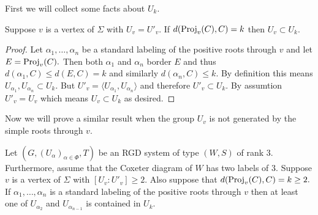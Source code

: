 \documentclass[class=book, crop=false]{standalone}
\begin{document}
First we will collect some facts about $U_k.$
\begin{lemma}
	\label{lem:deg3fg}
	Suppose $v$ is a vertex of $\Sigma$ with $U_v=U'_v.$ If $d(\mathrm{Proj}_v(C),C)=k$ then $U_v\subset U_k.$
\end{lemma}
\begin{proof}
	Let $\alpha_1,\dots,\alpha_n$ be a standard labeling of the positive roots through $v$ and let $E=\mathrm{Proj}_v(C).$ Then both $\alpha_1$ and $\alpha_n$ border $E$ and thus $d(\alpha_1,C)\le d(E,C)=k$ and similarly $d(\alpha_n,C)\le k.$ By definition this means $U_{\alpha_1},U_{\alpha_n}\subset U_k.$ But $U'_v=\langle U_{\alpha_1},U_{\alpha_n}\rangle$ and therefore $U'_v\subset U_k.$ By assumtion $U'_v=U_v$ which means $U_v\subset U_k$ as desired.
\end{proof}
Now we will prove a similar result when the group $U_v$ is not generated by the simple roots through $v.$
\begin{lemma}
	\label{lem:exdegfg}
	Let $(G,(U_\alpha)_{\alpha\in \Phi},T)$ be an RGD system of type $(W,S)$ of rank $3.$ Furthermore, assume that the Coxeter diagram of $W$ has two labels of $3.$ Suppose $v$ is a vertex of $\Sigma$ with $[U_v:U'_v]\ge 2.$ Also suppose that $d(\mathrm{Proj}_v(C),C)=k\ge 2.$ If $\alpha_1,\dots,\alpha_n$ is a standard labeling of the positive roots through $v$ then at least one of $U_{\alpha_2}$ and $U_{\alpha_{n-1}}$ is contained in $U_k.$
\end{lemma}
\end{document}
